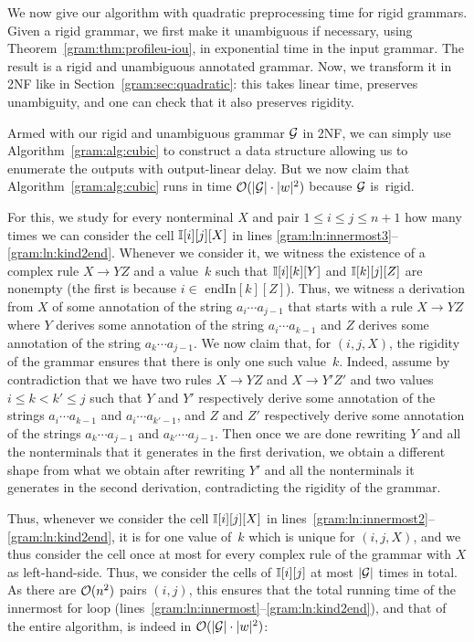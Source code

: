 %
%
We now give our algorithm with quadratic preprocessing time for
rigid grammars. Given a rigid grammar, we first make it unambiguous if
necessary, using Theorem~\ref{gram:thm:profileu-iou}, in exponential time in the
input grammar. The result is a rigid and unambiguous annotated grammar. Now, we
transform it in 2NF like in Section~\ref{gram:sec:quadratic}: this
takes linear time, preserves unambiguity, and one can check that it also
preserves rigidity.

Armed with our rigid and unambiguous grammar $\mathcal{G}$ in 2NF, we can simply use 
Algorithm~\ref{gram:alg:cubic} to construct a data structure allowing us to enumerate
the outputs with output-linear delay. But we now claim that
Algorithm~\ref{gram:alg:cubic} runs in time $\mathcal{O}(|\mathcal{G}| \cdot |w|^2)$ because $\mathcal{G}$
is~rigid.

For this, we study for every nonterminal $X$ and pair $1 \leq i \leq j \leq n+1$ how
many times we can consider the cell $\mathbb{I}[i][j][X]$ in lines
\ref{gram:ln:innermost3}--\ref{gram:ln:kind2end}. Whenever
we consider it, we witness the existence of a complex rule $X \rightarrow Y Z$
and a value~$k$ such that $\mathbb{I}[i][k][Y]$ and $\mathbb{I}[k][j][Z]$ are nonempty (the first
is because $i \in $ endIn$[k][Z]$). Thus, we witness a derivation from $X$ of
some annotation of the string $a_i \cdots a_{j-1}$ that starts with a rule $X
\rightarrow YZ$ where $Y$ derives some annotation of the string $a_i \cdots
a_{k-1}$ and $Z$ derives some annotation of the string $a_k \cdots a_{j-1}$. We
now claim that, for $(i, j, X)$, the rigidity of the grammar ensures that there is
only one such value~$k$. Indeed, assume by contradiction that we have two
rules $X \rightarrow YZ$ and $X \rightarrow Y'Z'$ and two values $i \leq k < k'
\leq j$ such that $Y$ and $Y'$ respectively derive some annotation of the
strings
$a_i \cdots a_{k-1}$ and $a_i \cdots a_{k'-1}$, and $Z$ and $Z'$ respectively
derive some annotation of the strings
$a_k \cdots a_{j-1}$ and $a_{k'} \cdots a_{j-1}$. Then once we are done
rewriting $Y$ and all the nonterminals that it generates in the first derivation, we
obtain a different shape from what we obtain after rewriting $Y'$ and all the
nonterminals it generates in the second derivation, contradicting the rigidity
of the grammar.

Thus, whenever we consider the cell $\mathbb{I}[i][j][X]$ in lines~\ref{gram:ln:innermost2}--\ref{gram:ln:kind2end}, it is
for one value of~$k$ which is unique for $(i,j,X)$, and we thus consider the
cell once
at most for every complex rule of the grammar with $X$ as left-hand-side. Thus,
we consider the cells of $\mathbb{I}[i][j]$ at most $|\mathcal{G}|$ times in total. As
there are $\mathcal{O}(n^2)$ pairs $(i,j)$, this ensures that the total running time of the
innermost for loop (lines~\ref{gram:ln:innermost}--\ref{gram:ln:kind2end}), and that of the entire algorithm, is indeed
in $\mathcal{O}(|\mathcal{G}| \cdot |w|^2)$:

